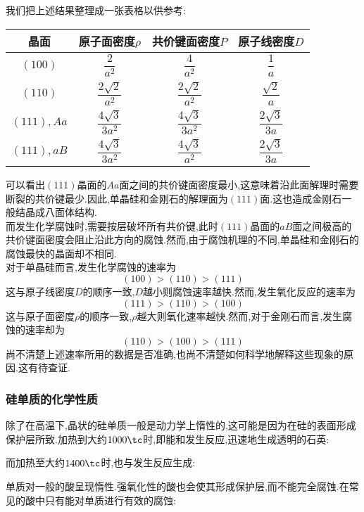 \documentclass{ctexart}
\begin{document}
我们把上述结果整理成一张表格以供参考:
\begin{table}[H]\centering
    \renewcommand\arraystretch{1.6}
    \begin{tabular}{|c|c|c|c|}\hline
        晶面    &原子面密度$\rho$   &共价键面密度$P$    &原子线密度$D$ \\\hline
        $(100)$ &$\dfrac{2}{a^2}$   &$\dfrac{4}{a^2}$   &$\dfrac{1}{a}$\\\hline
        $(110)$ &$\dfrac{2\sqrt2}{a^2}$   &$\dfrac{2\sqrt2}{a^2}$   &$\dfrac{\sqrt2}{a}$\\\hline
        $(111),Aa$ &$\dfrac{4\sqrt3}{3a^2}$   &$\dfrac{4\sqrt3}{3a^2}$   &$\dfrac{2\sqrt3}{3a}$\\\hline
        $(111),aB$ &$\dfrac{4\sqrt3}{3a^2}$   &$\dfrac{4\sqrt3}{a^2}$   &$\dfrac{2\sqrt3}{3a}$\\\hline
    \end{tabular}
\end{table}
可以看出$(111)$晶面的$Aa$面之间的共价键面密度最小,这意味着沿此面解理时需要断裂的共价键最少.因此,单晶硅和金刚石的解理面为$(111)$面.这也造成金刚石一般结晶成八面体结构.\\
\indent 而发生化学腐蚀时,需要按层破坏所有共价键,此时$(111)$晶面的$aB$面之间极高的共价键面密度会阻止沿此方向的腐蚀.然而,由于腐蚀机理的不同,单晶硅和金刚石的腐蚀最快的晶面却不相同.\\
\indent 对于单晶硅而言,发生化学腐蚀的速率为
\[(100)>(110)>(111)\]
这与原子线密度$D$的顺序一致,$D$越小则腐蚀速率越快.然而,发生氧化反应的速率为
\[(111)>(110)>(100)\]
这与原子面密度$\rho$的顺序一致,$\rho$越大则氧化速率越快.然而,对于金刚石而言,发生腐蚀的速率却为
\[(110)>(100)>(111)\]
尚不清楚上述速率所用的数据是否准确,也尚不清楚如何科学地解释这些现象的原因.这有待查证.
\subsubsection{硅单质的化学性质}
除了在高温下,晶状的硅单质一般是动力学上惰性的,这可能是因为在硅的表面形成保护层所致.加热到大约$1000\tc$时,即能和发生反应,迅速地生成透明的石英:
\begin{center}
\end{center}
而加热至大约$1400\tc$时,也与发生反应生成:
\begin{center}
\end{center}

\indent {}单质对一般的酸呈现惰性.强氧化性的酸也会使其形成保护层,而不能完全腐蚀.在常见的酸中只有能对单质进行有效的腐蚀:
\begin{center}
\end{center}
\end{document}
